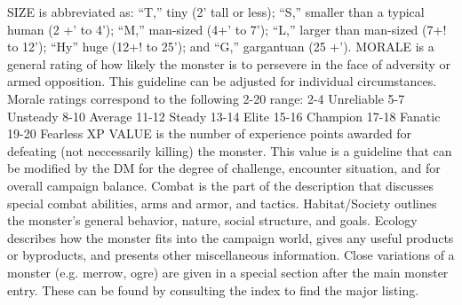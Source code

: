 \documentclass[../tsr2102.tex]{subfiles}
\begin{document}
SIZE is abbreviated as: “T,” tiny (2' tall or less); “S,” smaller than a typical
human (2 +’ to 4’); “M,” man-sized (4+' to 7’); “L,” larger than man-sized
(7+! to 12'); “Hy” huge (12+! to 25’); and “G,” gargantuan (25 +’).
MORALE is a general rating of how likely the monster is to persevere in
the face of adversity or armed opposition. This guideline can be adjusted
for individual circumstances. Morale ratings correspond to the following
2-20 range:
2-4 Unreliable
5-7 Unsteady
8-10 Average
11-12 Steady
13-14 Elite
15-16 Champion
17-18 Fanatic
19-20 Fearless
XP VALUE is the number of experience points awarded for defeating (not
neccessarily killing) the monster. This value is a guideline that can be
modified by the DM for the degree of challenge, encounter situation, and
for overall campaign balance.
Combat is the part of the description that discusses special combat abilities, arms and armor, and tactics.
Habitat/Society outlines the monster's general behavior, nature, social
structure, and goals.
Ecology describes how the monster fits into the campaign world, gives
any useful products or byproducts, and presents other miscellaneous information.
Close variations of a monster (e.g. merrow, ogre) are given in a special
section after the main monster entry. These can be found by consulting the
index to find the major listing.
\end{document}
